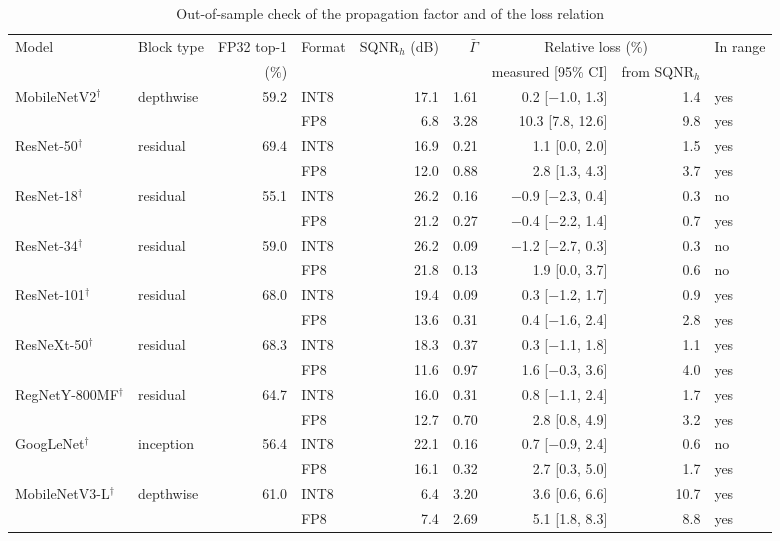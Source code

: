 \begin{table}
\footnotesize\setlength{\tabcolsep}{4pt}
\caption{Out-of-sample check of the propagation factor and of the loss relation}\label{tab:extcheck}
\begin{tabular}{@{}llrlrrrrl@{}}
\toprule
Model & Block type & FP32 top-1 & Format & SQNR$_h$ (dB) & $\bar\Gamma$ & \multicolumn{2}{c}{Relative loss (\%)} & In range \\
\cmidrule{7-8}
 & & (\%) & & & & measured [95\% CI] & from SQNR$_h$ & \\
\midrule
MobileNetV2$^\dagger$ & depthwise & 59.2 & INT8 & 17.1 & 1.61 & 0.2 [$-$1.0, 1.3] & 1.4 & yes \\
 &  &  & FP8 & 6.8 & 3.28 & 10.3 [7.8, 12.6] & 9.8 & yes \\
ResNet-50$^\dagger$ & residual & 69.4 & INT8 & 16.9 & 0.21 & 1.1 [0.0, 2.0] & 1.5 & yes \\
 &  &  & FP8 & 12.0 & 0.88 & 2.8 [1.3, 4.3] & 3.7 & yes \\
ResNet-18$^\dagger$ & residual & 55.1 & INT8 & 26.2 & 0.16 & $-$0.9 [$-$2.3, 0.4] & 0.3 & no \\
 &  &  & FP8 & 21.2 & 0.27 & $-$0.4 [$-$2.2, 1.4] & 0.7 & yes \\
ResNet-34$^\dagger$ & residual & 59.0 & INT8 & 26.2 & 0.09 & $-$1.2 [$-$2.7, 0.3] & 0.3 & no \\
 &  &  & FP8 & 21.8 & 0.13 & 1.9 [0.0, 3.7] & 0.6 & no \\
ResNet-101$^\dagger$ & residual & 68.0 & INT8 & 19.4 & 0.09 & 0.3 [$-$1.2, 1.7] & 0.9 & yes \\
 &  &  & FP8 & 13.6 & 0.31 & 0.4 [$-$1.6, 2.4] & 2.8 & yes \\
ResNeXt-50$^\dagger$ & residual & 68.3 & INT8 & 18.3 & 0.37 & 0.3 [$-$1.1, 1.8] & 1.1 & yes \\
 &  &  & FP8 & 11.6 & 0.97 & 1.6 [$-$0.3, 3.6] & 4.0 & yes \\
RegNetY-800MF$^\dagger$ & residual & 64.7 & INT8 & 16.0 & 0.31 & 0.8 [$-$1.1, 2.4] & 1.7 & yes \\
 &  &  & FP8 & 12.7 & 0.70 & 2.8 [0.8, 4.9] & 3.2 & yes \\
GoogLeNet$^\dagger$ & inception & 56.4 & INT8 & 22.1 & 0.16 & 0.7 [$-$0.9, 2.4] & 0.6 & no \\
 &  &  & FP8 & 16.1 & 0.32 & 2.7 [0.3, 5.0] & 1.7 & yes \\
MobileNetV3-L$^\dagger$ & depthwise & 61.0 & INT8 & 6.4 & 3.20 & 3.6 [0.6, 6.6] & 10.7 & yes \\
 &  &  & FP8 & 7.4 & 2.69 & 5.1 [1.8, 8.3] & 8.8 & yes \\

\end{tabular}
\end{table}
